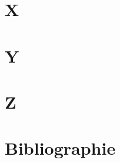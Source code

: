 \documentclass[10.5pt,a4paper]{article}
\begin{document}
\begin{multicols}{2}
\section*{X}

\section*{Y}

\section*{Z}
\end{multicols}

\section{Bibliographie}
\begingroup
\renewcommand{\section}[2]{}


\vspace{10cm}
\endgroup
\end{document}
